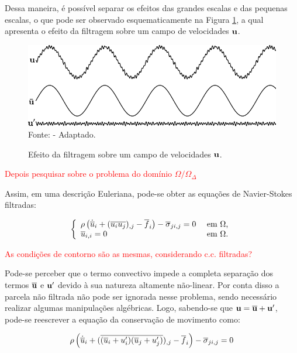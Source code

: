 \documentclass[_ArquivoPrincipal.tex]{subfiles}
\begin{document}
Dessa maneira, é possível separar os efeitos das grandes escalas e das pequenas escalas, o que pode ser observado esquematicamente na Figura \ref{fig:EfeitoFiltragem}, a qual apresenta o efeito da filtragem sobre um campo de velocidades $\mathbf{u}$.

\begin{figure}[h]
    \centering
    \caption{Efeito da filtragem sobre um campo de velocidades $\mathbf{u}$.}
    \includegraphics[width=.75\linewidth]{Figuras/efeito_filtragem.pdf}
    \\Fonte:  - Adaptado.
    \label{fig:EfeitoFiltragem}
\end{figure}

\textcolor{red}{Depois pesquisar sobre o problema do domínio $\Omega/\Omega_\Delta$}

Assim, em uma descrição Euleriana, pode-se obter as equações de Navier-Stokes filtradas:

\begin{equation}
    \left\{
    \begin{array}{ll}
        \rho\left({\dot{\overline{u}}_i+(\overline{u_iu_j})_{,j}-\overline{f}_i}\right)-\overline{\sigma}_{ji,j}=0 & \text{ em }\Omega\text{,} \\
        \overline{u}_{i,i}=0                                                                       & \text{ em }\Omega\text{.}
    \end{array}
    \right.
\end{equation}

\textcolor{red}{As condições de contorno são as mesmas, considerando c.c. filtradas?}

Pode-se perceber que o termo convectivo impede a completa separação dos termos $\overline{\mathbf{u}}$ e $\mathbf{u}'$ devido à sua natureza altamente não-linear. Por conta disso a parcela não filtrada não pode ser ignorada nesse problema, sendo necessário realizar algumas manipulações algébricas. Logo, sabendo-se que $\mathbf{u}=\overline{\mathbf{u}}+\mathbf{u}'$, pode-se reescrever a equação da conservação de movimento como:

\begin{equation}
    \rho\left({\dot{\overline{u}}_i+(\overline{(\overline{u}_i+u'_i)(\overline{u}_j+u'_j)})_{,j}-\overline{f}_i}\right)-\overline{\sigma}_{ji,j}=0
\end{equation}
\end{document}
